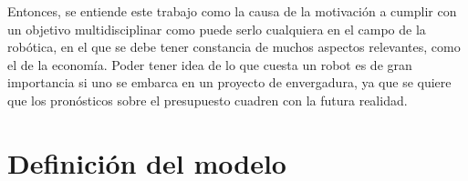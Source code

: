 \documentclass[twoside,11pt]{report}
\begin{document}
Entonces, se entiende este trabajo como la causa de la motivación a cumplir con un objetivo multidisciplinar como puede serlo cualquiera en el campo de la robótica, en el que se debe tener constancia de muchos aspectos relevantes, como el de la economía. Poder tener idea de lo que cuesta un robot es de gran importancia si uno se embarca en un proyecto de envergadura, ya que se quiere que los pronósticos sobre el presupuesto cuadren con la futura realidad. 

\newpage
\chapter{Definición del modelo} \label{def}
\end{document}
